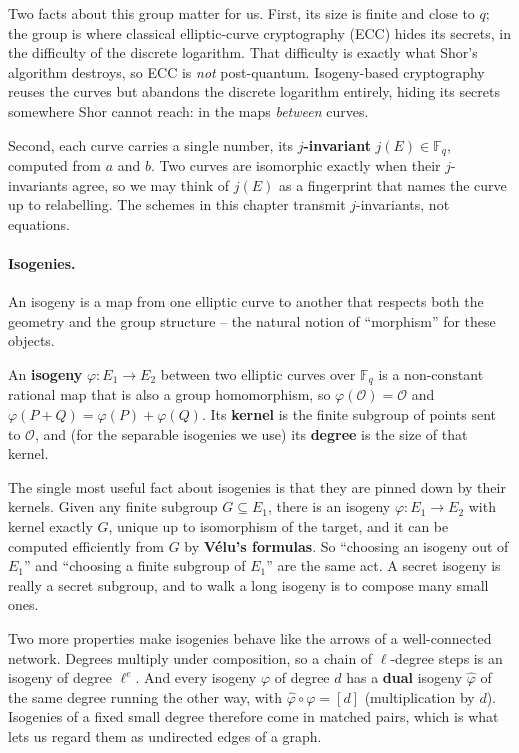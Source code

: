 Two facts about this group matter for us. First, its size is finite and close to $q$; the group is where classical elliptic-curve cryptography (ECC) hides its secrets, in the difficulty of the discrete logarithm. That difficulty is exactly what Shor's algorithm destroys, so ECC is \emph{not} post-quantum. Isogeny-based cryptography reuses the curves but abandons the discrete logarithm entirely, hiding its secrets somewhere Shor cannot reach: in the maps \emph{between} curves.

Second, each curve carries a single number, its \textbf{$j$-invariant} $j(E) \in \mathbb{F}_q$, computed from $a$ and $b$. Two curves are isomorphic exactly when their $j$-invariants agree, so we may think of $j(E)$ as a fingerprint that names the curve up to relabelling. The schemes in this chapter transmit $j$-invariants, not equations.

\paragraph{Isogenies.}
An isogeny is a map from one elliptic curve to another that respects both the geometry and the group structure -- the natural notion of ``morphism'' for these objects.

\begin{definition}[Isogeny]
An \textbf{isogeny} $\varphi : E_1 \to E_2$ between two elliptic curves over $\mathbb{F}_q$ is a non-constant rational map that is also a group homomorphism, so $\varphi(\mathcal{O}) = \mathcal{O}$ and $\varphi(P + Q) = \varphi(P) + \varphi(Q)$. Its \textbf{kernel} is the finite subgroup of points sent to $\mathcal{O}$, and (for the separable isogenies we use) its \textbf{degree} is the size of that kernel.
\end{definition}

The single most useful fact about isogenies is that they are pinned down by their kernels. Given any finite subgroup $G \subseteq E_1$, there is an isogeny $\varphi : E_1 \to E_2$ with kernel exactly $G$, unique up to isomorphism of the target, and it can be computed efficiently from $G$ by \textbf{V\'{e}lu's formulas}. So ``choosing an isogeny out of $E_1$'' and ``choosing a finite subgroup of $E_1$'' are the same act. A secret isogeny is really a secret subgroup, and to walk a long isogeny is to compose many small ones.

Two more properties make isogenies behave like the arrows of a well-connected network. Degrees multiply under composition, so a chain of $\ell$-degree steps is an isogeny of degree $\ell^e$. And every isogeny $\varphi$ of degree $d$ has a \textbf{dual} isogeny $\hat{\varphi}$ of the same degree running the other way, with $\hat{\varphi} \circ \varphi = [d]$ (multiplication by $d$). Isogenies of a fixed small degree therefore come in matched pairs, which is what lets us regard them as undirected edges of a graph.

